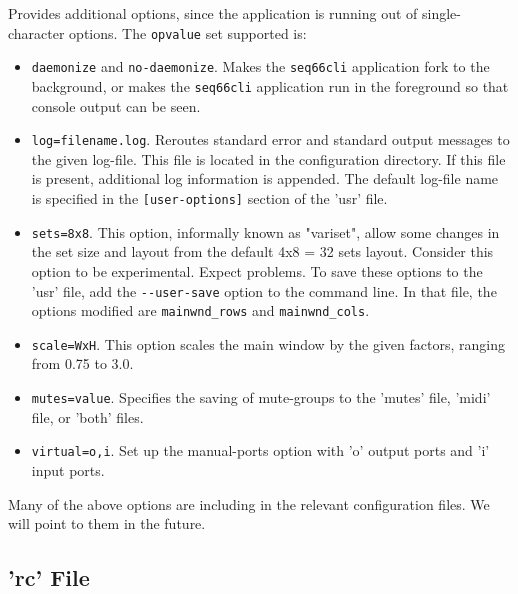       Provides additional options, since the application is running out of
      single-character options.  The \texttt{opvalue} set supported is:
      \begin{itemize}
         \item \texttt{daemonize} and \texttt{no-daemonize}.
            Makes the \texttt{seq66cli} application fork to the background, or
            makes the \texttt{seq66cli} application
            run in the foreground so that console output can be seen.
         \item \texttt{log=filename.log}.
            Reroutes standard error and standard
            output messages to the given log-file.  This file is located in
            the configuration directory.
            If this file is present, additional log information is appended.
            The default log-file name is specified in the
            \texttt{[user-options]} section of the 'usr' file.
         \item \texttt{sets=8x8}.
            This option, informally known as "variset", allow some changes in
            the set size and layout from the default 4x8 = 32 sets layout.
            Consider this option to be experimental. Expect problems.
            To save these options to the 'usr' file, add the
            \texttt{-{}-user-save} option to the command line.
            In that file, the options modified are \texttt{mainwnd\_rows} and
            \texttt{mainwnd\_cols}.
         \item \texttt{scale=WxH}.
            This option scales the main window by the given factors,
            ranging from 0.75 to 3.0.
         \item \texttt{mutes=value}. Specifies the saving of mute-groups
            to the 'mutes' file, 'midi' file, or 'both' files.
         \item \texttt{virtual=o,i}. Set up the manual-ports option with 'o'
            output ports and 'i' input ports.
      \end{itemize}

      Many of the above options are including in the relevant configuration
      files.  We will point to them in the future.

\subsection{'rc' File}
\label{subsec:configuration_rc}

